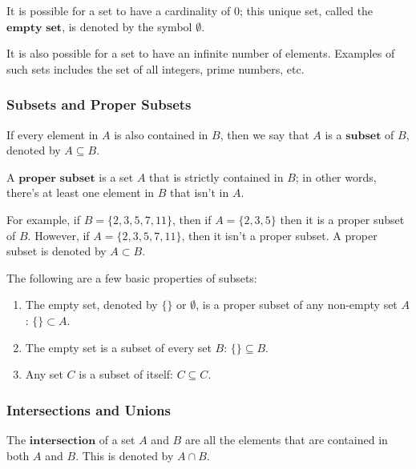 \documentclass[openany]{book}
\begin{document}
It is possible for a set to have a cardinality of $0$; this unique set, called the $\textbf{empty set}$, is denoted by the symbol $\emptyset$.

It is also possible for a set to have an infinite number of elements. Examples of such sets includes the set of all integers, prime numbers, etc.

\newpage

\subsubsection{Subsets and Proper Subsets} 
\begin{defn}[Subset]
	If every element in $A$ is also contained in $B$, then we say that $A$ is a $\textbf{subset}$ of $B$, denoted by $A\subseteq B$.
\end{defn}

\begin{defn}
	A $\textbf{proper subset}$ is a set $A$ that is strictly contained in $B$; in other words, there's at least one element in $B$ that isn't in $A$.
\end{defn}

\begin{example}
	For example, if $B=\{2,3,5,7,11\}$, then if $A=\{2,3,5\}$ then it is a proper subset of $B$. However, if $A=\{2,3,5,7,11\}$, then it isn't a proper subset. A proper subset is denoted by $A\subset B$.
\end{example}

The following are a few basic properties of subsets:
\begin{enumerate}
	\item The empty set, denoted by $\{\}$ or $\emptyset$, is a proper subset of any non-empty set $A$: $\{\}\subset A$.
	\item The empty set is a subset of every set $B$: $\{\}\subseteq B$.
	\item Any set $C$ is a subset of itself: $C\subseteq C$.
\end{enumerate}

\subsubsection{Intersections and Unions}
\begin{defn}[Intersection]
	The $\textbf{intersection}$ of a set $A$ and $B$ are all the elements that are contained in both $A$ and $B$. This is denoted by $A\cap B$.
\end{defn}
\end{document}
